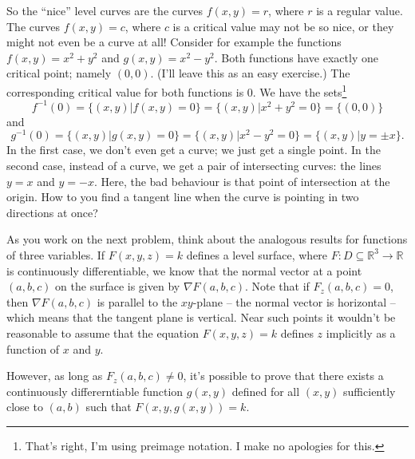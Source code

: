 \documentclass[letterpaper,12pt]{article}
\newcommand{\R}{\mathbb{R}}
\begin{document}
\begin{enumerate}
So the ``nice'' level curves are the curves $f(x,y)=r$, where $r$ is a regular value. The curves $f(x,y)=c$, where $c$ is a critical value may not be so nice, or they might not even be a curve at all! Consider for example the functions $f(x,y)=x^2+y^2$ and $g(x,y)=x^2-y^2$. Both functions have exactly one critical point; namely $(0,0)$. (I'll leave this as an easy exercise.) The corresponding critical value for both functions is 0. We have the sets\footnote{That's right, I'm using preimage notation. I make no apologies for this.}
\[
 f^{-1}(0) = \{(x,y) | f(x,y)=0\} = \{ (x,y) | x^2+y^2 = 0\} = \{(0,0)\}
\]
and 
\[
 g^{-1}(0) = \{(x,y) | g(x,y)=0\} = \{ (x,y) | x^2-y^2=0\} = \{(x,y) | y=\pm x\}.
\]
In the first case, we don't even get a curve; we just get a single point. In the second case, instead of a curve, we get a pair of intersecting curves: the lines $y=x$ and $y=-x$. Here, the bad behaviour is that point of intersection at the origin. How to you find a tangent line when the curve is pointing in two directions at once?

\bigskip

As you work on the next problem, think about the analogous results for functions of three variables. If $F(x,y,z)=k$ defines a level surface, where $F:D\subseteq \R^3\to \R$ is continuously differentiable, we know that the normal vector at a point $(a,b,c)$ on the surface is given by $\nabla F(a,b,c)$. Note that if $F_z(a,b,c)=0$, then $\nabla F(a,b,c)$ is parallel to the $xy$-plane -- the normal vector is horizontal -- which means that the tangent plane is vertical. Near such points it wouldn't be reasonable to assume that the equation $F(x,y,z)=k$ defines $z$ implicitly as a function of $x$ and $y$.

However, as long as $F_z(a,b,c)\neq 0$, it's possible to prove that there exists a continuously differerntiable function $g(x,y)$ defined for all $(x,y)$ sufficiently close to $(a,b)$ such that $F(x,y,g(x,y))=k$.

 \newpage



\end{enumerate}
\end{document}
